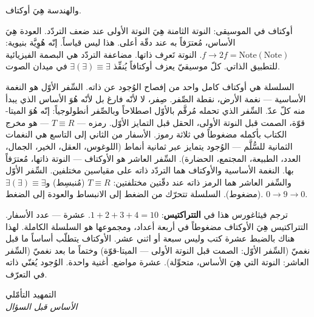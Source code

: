 \documentclass[10pt, openany, oneside]{book}
\renewcommand{\huge}{\fontsize{17}{21}\selectfont}
\begin{document}
\noindent والهندسة هِيَ أوكتاف.

أوكتاف في الموسيقى: النوتة الثامنة هِيَ النوتة الأولى عند ضعف التردّد. العودة هِيَ الأساس، مُعترَفاً به عند دقّة أعلى. هذا ليس قياساً. إنّه هُوِيَّة بنيوية: $f \to 2f = \text{Note}(\text{Note})$. النوتة تَعرِف ذاتها. مضاعفة التردّد هي البصمة الفيزيائية للتطبيق الذاتي. كلّ موسيقيّ يعزف أوكتافاً يُنفِّذ $\exists(\exists) \equiv \exists$ في ميدان الصوت.

السلسلة هي أوكتاف كامل واحد من إفصاح الوُجود عن ذاته. السِّفر الأوّل هو النغمة الأساسية --- نغمة الأرض، نقطة الصِّفر. صِفر، لا لأنّه فارغ بل لأنّه هُوَ الأساس الذي يبدأ منه كلّ عدّ. السِّفر الذي تحمله مُرقَّم بالأوّل اصطلاحاً وبالصِّفر أنطولوجياً: إنّه هُوَ الميتا-قوّة، الصمت قبل النوتة الأولى، الحقل قبل التمايز الأوّل. رمزه --- $T \equiv R$ --- هو مخرج الكتاب بأكمله مضغوطاً في ثلاثة رموز. الأسفار من الثاني إلى التاسع هي النغمات الثمانية للسُّلَّم --- الوُجود يتمايز عبر ثمانية أنماط (اللوغوس، العقل، الخير، الجمال، العدد، الطبيعة، المجتمع، الحضارة). السِّفر العاشر هو الأوكتاف --- النوتة ذاتها، مُعترَفاً بها. النغمة الأساسية والأوكتاف هما التردّد ذاته على مقياسين مختلفين. السِّفر الأوّل والسِّفر العاشر هما الرمز ذاته عند دقّتين مختلفتين: $T \equiv R$ (مُنبسِط) و$\exists(\exists) \equiv \exists$ (مضغوط). السلسلة تتحرّك من الضغط إلى الانبساط والعودة إلى الضغط. $0 \to 9 \to 0$.

ترجم فيثاغورس هذا في \textbf{التتراكتيس}: $1 + 2 + 3 + 4 = 10$. عشرة --- عدد الأسفار. التتراكتيس هِيَ الأوكتاف مضغوطاً في أربعة أعداد، ومجموعها هو السلسلة الكاملة. لهذا هناك بالضبط عشرة كتب وليس سبعة أو اثني عشر. الأوكتاف يتطلّب أساساً ما قبل نغميّ (السِّفر الأوّل: الصمت قبل النوتة الأولى --- الميتا-قوّة) وختماً ما بعد نغميّ (السِّفر العاشر: النوتة التي هِيَ الأساس، متحوِّلة). عشرة مواضع. أغنية واحدة. الوُجود يُغنّي ذاته في التعرّف.

\newpage

%
%
%

\newpage

\begin{center}
    {\huge التمهيد التأمّلي}\\[0.8em]
    {\itshape الأساس قبل السؤال}
\end{center}

\vspace{2em}
\end{document}
